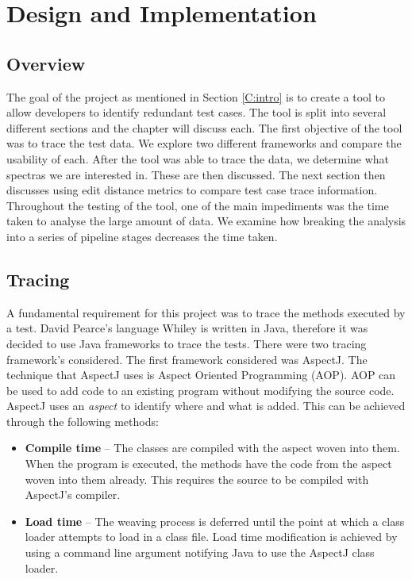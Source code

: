 \chapter{Design and Implementation}\label{C:workdone}

\section{Overview}

The goal of the project as mentioned in Section \ref{C:intro} is to create a tool to allow developers to identify redundant test cases. The tool is split into several different sections and the chapter will discuss each. The first objective of the tool was to trace the test data. We explore two different frameworks and compare the usability of each. After the tool was able to trace the data, we determine what spectras we are interested in. These are then discussed. The next section then discusses using edit distance metrics to compare test case trace information. Throughout the testing of the tool, one of the main impediments was the time taken to analyse the large amount of data. We examine how breaking the analysis into a series of pipeline stages decreases the time taken.

\section{Tracing}
\label{S:trace}
A fundamental requirement for this project was to trace the methods executed by a test. David Pearce's language Whiley is written in Java, therefore it was decided to use Java frameworks to trace the tests. There were two tracing framework's considered. The first framework considered was AspectJ. The technique that AspectJ uses is Aspect Oriented Programming (AOP). AOP can be used to add code to an existing program without modifying the source code. AspectJ uses an \textit{aspect} to identify where and what is added. This can be achieved through the following methods:

\begin{itemize}
\item \textbf{Compile time} --
The classes are compiled with the aspect woven into them. When the program is executed, the methods have the code from the aspect woven into them already. This requires the source to be compiled with AspectJ's compiler.
\item \textbf{Load time} --
The weaving process is deferred until the point at which a class loader attempts to load in a class file. Load time modification is achieved by using a command line argument notifying Java to use the AspectJ class loader.
\end{itemize}

